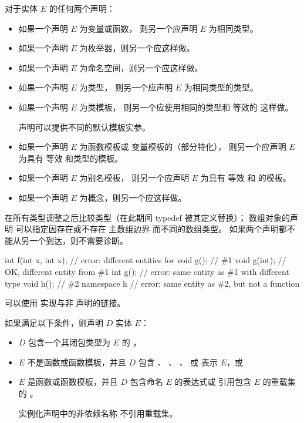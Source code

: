 \pnum
{}%
%
对于实体 $E$ 的任何两个声明：
\begin{itemize}
\item
如果一个声明 $E$ 为变量或函数，
则另一个应声明 $E$ 为相同类型。
\item
如果一个声明 $E$ 为枚举器，则另一个应这样做。
\item
如果一个声明 $E$ 为命名空间，则另一个应这样做。
\item
如果一个声明 $E$ 为类型，
则另一个应声明 $E$ 为相同类型的类型。
\item
如果一个声明 $E$ 为类模板，
则另一个应使用相同的类型和
等效的  这样做。
\begin{note}
声明可以提供不同的默认模板实参。
\end{note}
\item
如果一个声明 $E$ 为函数模板或
变量模板的（部分特化），
则另一个应声明 $E$ 为具有
等效  和类型的模板。
\item
如果一个声明 $E$ 为别名模板，
则另一个应声明 $E$ 为具有
等效  和  的模板。
\item
如果一个声明 $E$ 为概念，则另一个应这样做。
\end{itemize}
在所有类型调整之后比较类型（在此期间
typedef 被其定义替换）；
数组对象的声明
可以指定因存在或不存在
主数组边界 而不同的数组类型。
如果两个声明都不能从另一个到达，则不需要诊断。
\begin{example}
\begin{codeblock}
int f(int x, int x);    // error: different entities for 
void g();               // \#1
void g(int);            // OK, different entity from \#1
int g();                // error: same entity as \#1 with different type
void h();               // \#2
namespace h {}          // error: same entity as \#2, but not a function
\end{codeblock}
\end{example}

\pnum
\begin{note}
可以使用
 实现与非 \Cpp{} 声明的链接。
\end{note}

\pnum
如果满足以下条件，则声明 $D$  实体 $E$：
\begin{itemize}
\item
$D$ 包含一个其闭包类型为 $E$ 的 ，
\item
$E$ 不是函数或函数模板，并且 $D$ 包含
、
、
、
 或
表示 $E$，或
\item
$E$ 是函数或函数模板，并且
$D$ 包含命名 $E$ 的表达式或
引用包含 $E$ 的重载集的 。
\begin{note}
实例化声明中的非依赖名称
不引用重载集。
\end{note}
\end{itemize}

